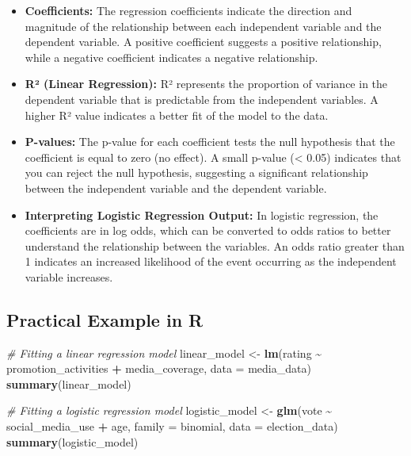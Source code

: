 \documentclass[
]{book}
\newenvironment{Shaded}{\begin{snugshade}}{\end{snugshade}}
\newcommand{\AttributeTok}[1]{\textcolor[rgb]{0.13,0.29,0.53}{#1}}
\newcommand{\CommentTok}[1]{\textcolor[rgb]{0.56,0.35,0.01}{\textit{#1}}}
\newcommand{\FunctionTok}[1]{\textcolor[rgb]{0.13,0.29,0.53}{\textbf{#1}}}
\newcommand{\NormalTok}[1]{#1}
\newcommand{\OtherTok}[1]{\textcolor[rgb]{0.56,0.35,0.01}{#1}}
\newcommand{\SpecialCharTok}[1]{\textcolor[rgb]{0.81,0.36,0.00}{\textbf{#1}}}
\begin{document}
\begin{itemize}
\item
  \textbf{Coefficients:} The regression coefficients indicate the direction and magnitude of the relationship between each independent variable and the dependent variable. A positive coefficient suggests a positive relationship, while a negative coefficient indicates a negative relationship.
\item
  \textbf{R² (Linear Regression):} R² represents the proportion of variance in the dependent variable that is predictable from the independent variables. A higher R² value indicates a better fit of the model to the data.
\item
  \textbf{P-values:} The p-value for each coefficient tests the null hypothesis that the coefficient is equal to zero (no effect). A small p-value (\textless{} 0.05) indicates that you can reject the null hypothesis, suggesting a significant relationship between the independent variable and the dependent variable.
\item
  \textbf{Interpreting Logistic Regression Output:} In logistic regression, the coefficients are in log odds, which can be converted to odds ratios to better understand the relationship between the variables. An odds ratio greater than 1 indicates an increased likelihood of the event occurring as the independent variable increases.
\end{itemize}

\hypertarget{practical-example-in-r}{%
\subsection*{Practical Example in R}\label{practical-example-in-r}}

\begin{Shaded}
\begin{Highlighting}[]
\CommentTok{\# Fitting a linear regression model}
\NormalTok{linear\_model }\OtherTok{\textless{}{-}} \FunctionTok{lm}\NormalTok{(rating }\SpecialCharTok{\textasciitilde{}}\NormalTok{ promotion\_activities }\SpecialCharTok{+}\NormalTok{ media\_coverage, }\AttributeTok{data =}\NormalTok{ media\_data)}
\FunctionTok{summary}\NormalTok{(linear\_model)}

\CommentTok{\# Fitting a logistic regression model}
\NormalTok{logistic\_model }\OtherTok{\textless{}{-}} \FunctionTok{glm}\NormalTok{(vote }\SpecialCharTok{\textasciitilde{}}\NormalTok{ social\_media\_use }\SpecialCharTok{+}\NormalTok{ age, }\AttributeTok{family =}\NormalTok{ binomial, }\AttributeTok{data =}\NormalTok{ election\_data)}
\FunctionTok{summary}\NormalTok{(logistic\_model)}
\end{Highlighting}
\end{Shaded}
\end{document}

